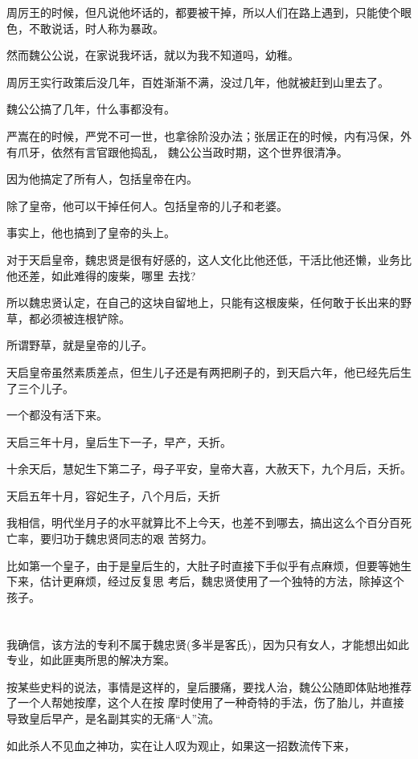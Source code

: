 \documentclass[11pt,a4paper,onecolumn]{article}
\begin{document}
周厉王的时候，但凡说他坏话的，都要被干掉，所以人们在路上遇到，只能使个眼色，不敢说话，时人称为暴政。

然而魏公公说，在家说我坏话，就以为我不知道吗，幼稚。

周厉王实行政策后没几年，百姓渐渐不满，没过几年，他就被赶到山里去了。

魏公公搞了几年，什么事都没有。

严嵩在的时候，严党不可一世，也拿徐阶没办法；张居正在的时候，内有冯保，外有爪牙，依然有言官跟他捣乱，
魏公公当政时期，这个世界很清净。

因为他搞定了所有人，包括皇帝在内。

除了皇帝，他可以干掉任何人。包括皇帝的儿子和老婆。

事实上，他也搞到了皇帝的头上。

对于天启皇帝，魏忠贤是很有好感的，这人文化比他还低，干活比他还懒，业务比他还差，如此难得的废柴，哪里
去找?

所以魏忠贤认定，在自己的这块自留地上，只能有这根废柴，任何敢于长出来的野草，都必须被连根铲除。

所谓野草，就是皇帝的儿子。

天启皇帝虽然素质差点，但生儿子还是有两把刷子的，到天启六年，他已经先后生了三个儿子。

一个都没有活下来。

天启三年十月，皇后生下一子，早产，夭折。

十余天后，慧妃生下第二子，母子平安，皇帝大喜，大赦天下，九个月后，夭折。

天启五年十月，容妃生子，八个月后，夭折

我相信，明代坐月子的水平就算比不上今天，也差不到哪去，搞出这么个百分百死亡率，要归功于魏忠贤同志的艰
苦努力。

比如第一个皇子，由于是皇后生的，大肚子时直接下手似乎有点麻烦，但要等她生下来，估计更麻烦，经过反复思
考后，魏忠贤使用了一个独特的方法，除掉这个孩子。

\section[\thesection]{}

我确信，该方法的专利不属于魏忠贤(多半是客氏)，因为只有女人，才能想出如此专业，如此匪夷所思的解决方案。

按某些史料的说法，事情是这样的，皇后腰痛，要找人治，魏公公随即体贴地推荐了一个人帮她按摩，这个人在按
摩时使用了一种奇特的手法，伤了胎儿，并直接导致皇后早产，是名副其实的无痛``人''流。

如此杀人不见血之神功，实在让人叹为观止，如果这一招数流传下来，
\end{document}

